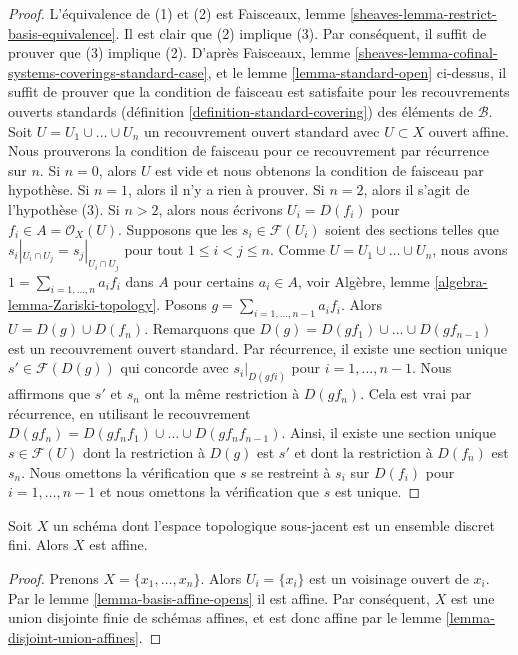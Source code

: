 \begin{proof}
L'équivalence de (1) et (2) est Faisceaux,
lemme \ref{sheaves-lemma-restrict-basis-equivalence}. Il est clair
que (2) implique (3). Par conséquent,
il suffit de prouver que (3) implique (2). D'après
Faisceaux, lemme \ref{sheaves-lemma-cofinal-systems-coverings-standard-case}, et le
lemme \ref{lemma-standard-open} ci-dessus, il suffit de prouver que la condition
de faisceau est satisfaite pour les recouvrements
ouverts standards (définition
\ref{definition-standard-covering}) des éléments
de $\mathcal{B}$. Soit $U = U_1 \cup \ldots \cup U_n$ un recouvrement
ouvert standard avec $U \subset X$
ouvert affine. Nous prouverons la
condition de faisceau pour ce recouvrement par
récurrence sur $n$. Si $n = 0$, alors $U$ est vide et nous obtenons
la condition de faisceau par hypothèse. Si $n = 1$, alors il
n'y a rien à prouver. Si $n = 2$, alors il
s'agit de l'hypothèse (3). Si $n > 2$, alors nous écrivons $U_i = D(f_i)$ pour $f_i \in
A = \mathcal{O}_X(U)$. Supposons que les $s_i \in \mathcal{F}(U_i)$
soient des sections telles que $s_i|_{U_i \cap U_j} = s_j|_{U_i \cap U_j}$ pour tout
$1 \leq i < j \leq n$. Comme $U = U_1 \cup \ldots
\cup U_n$, nous avons $1 = \sum_{i = 1, \ldots, n} a_i f_i$ dans $A$ pour certains
$a_i \in A$, voir Algèbre, lemme \ref{algebra-lemma-Zariski-topology}.
Posons $g = \sum_{i = 1, \ldots,
n - 1} a_if_i$. Alors $U = D(g)
\cup D(f_n)$. Remarquons que $D(g) = D(gf_1) \cup \ldots \cup D(gf_{n
- 1})$ est un recouvrement ouvert standard. Par récurrence, il existe une
section unique $s' \in \mathcal{F}(D(g))$ qui
concorde avec $s_i|_{D(gfi)}$ pour $i = 1, \ldots,
n - 1$. Nous affirmons que $s'$ et $s_n$ ont la même restriction
à $D(gf_n)$. Cela est vrai par récurrence, en utilisant le
recouvrement $D(gf_n) = D(gf_nf_1) \cup \ldots \cup D(gf_nf_{n
- 1})$. Ainsi, il existe une section unique $s \in \mathcal{F}(U)$
dont la restriction à $D(g)$ est $s'$ et dont la restriction
à $D(f_n)$ est $s_n$. Nous omettons la vérification que
$s$ se restreint à $s_i$ sur $D(f_i)$ pour $i = 1, \ldots, n - 1$
et nous omettons la vérification que $s$ est unique.
\end{proof}

\begin{lemma}
\label{lemma-scheme-finite-discrete-affine}
Soit $X$ un schéma dont l'espace topologique sous-jacent est
un ensemble discret fini.
Alors $X$ est affine.
\end{lemma}

\begin{proof}
Prenons $X = \{x_1, \ldots, x_n\}$. Alors $U_i = \{x_i\}$ est un voisinage ouvert de
$x_i$. Par le
lemme \ref{lemma-basis-affine-opens} il est
affine. Par conséquent, $X$ est une union disjointe finie de schémas affines, et
est donc affine par
le lemme \ref{lemma-disjoint-union-affines}.
\end{proof}

